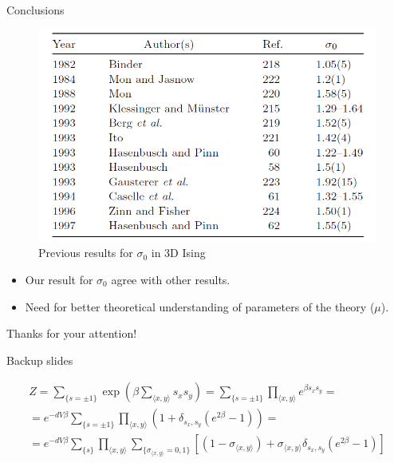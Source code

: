 \documentclass[12pt,handout]{beamer}
\begin{document}
\begin{frame}{Conclusions}
\begin{center}
\begin{figure}
\centering
\includegraphics[scale=0.4]{tableauthors.png}
\caption{Previous results for $\sigma_0$ in 3D Ising\label{fig:authors}}
\end{figure}
\begin{itemize}
\item Our result for $\sigma_0$ agree with other results.
\item Need for better theoretical understanding of parameters of the theory ($\mu$).
\end{itemize}
\end{center}
\end{frame}

\begin{frame}
\begin{center}

{\Huge
Thanks for your attention!
}

\end{center}
\end{frame}

\begin{frame}{Backup slides}
\begin{center}

\begin{gather*}
Z = \sum_{\lbrace s = \pm 1\rbrace} \exp \left( \beta \sum_{\langle x, y \rangle} s_x s_y \right) = \sum_{\lbrace s = \pm 1 \rbrace} \prod_{\langle x, y \rangle} e^{ \beta  s_x s_y} = \\[20pt]
= e ^{ -d V \beta } \sum_{\lbrace s = \pm 1 \rbrace} \prod_{\langle x, y \rangle} \left( 1 + \delta_{s_x, s_y} \left( e^{  2 \beta} - 1 \right) \right) = \\[20pt]
= e^{ -d V \beta} \sum_{\lbrace s \rbrace} \prod_{\langle x, y \rangle}   \sum_{\lbrace \sigma_{\langle x, y \rangle} = 0,1 \rbrace} \left[ \left( 1 - \sigma_{\langle x, y \rangle} \right)
+ \sigma_{\langle x, y \rangle} \delta_{s_x, s_y} \left( e^{ 2 \beta } - 1 \right) \right]
\end{gather*}

\end{center}
\end{frame}
\end{document}
